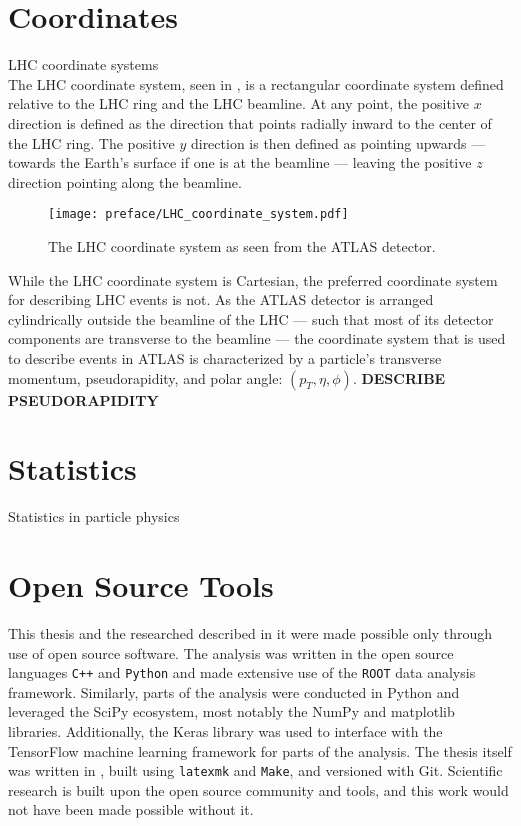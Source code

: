 \section{Coordinates}\label{section:coordinates}

LHC coordinate systems\\

The LHC coordinate system, seen in , is a rectangular coordinate system defined relative to the LHC ring and the LHC beamline.
At any point, the positive $x$ direction is defined as the direction that points radially inward to the center of the LHC ring.
The positive $y$ direction is then defined as pointing upwards --- towards the Earth's surface if one is at the beamline --- leaving the positive $z$ direction pointing along the beamline.\\

\begin{figure}[htbp]
 \centering
 \texttt{[image: preface/LHC\_coordinate\_system.pdf]}
 \caption{The LHC coordinate system as seen from the ATLAS detector.}
 \label{fig:LHC_coordinate_system}
\end{figure}

While the LHC coordinate system is Cartesian, the preferred coordinate system for describing LHC events is not.
As the ATLAS detector is arranged cylindrically outside the beamline of the LHC --- such that most of its detector components are transverse to the beamline --- the coordinate system that is used to describe events in ATLAS is characterized by a particle's transverse momentum, pseudorapidity, and polar angle: $\left(p_T, \eta, \phi\right)$.
\textbf{DESCRIBE PSEUDORAPIDITY}

\section{Statistics}\label{section:statistics}

Statistics in particle physics

\section{Open Source Tools}\label{section:open_source}

This thesis and the researched described in it were made possible only through use of open source software.
The analysis was written in the open source languages \texttt{C++} and \texttt{Python} and made extensive use of the \texttt{ROOT} data analysis framework.
Similarly, parts of the analysis were conducted in Python and leveraged the SciPy ecosystem, most notably the NumPy and matplotlib libraries.
Additionally, the Keras library was used to interface with the TensorFlow machine learning framework for parts of the analysis.
The thesis itself was written in \LaTeXe, built using \texttt{latexmk} and \texttt{Make}, and versioned with Git.
Scientific research is built upon the open source community and tools, and this work would not have been made possible without it.
